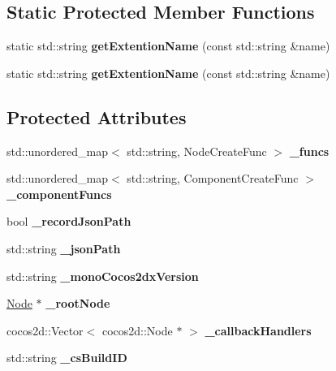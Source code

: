 \subsection*{Static Protected Member Functions}
\begin{DoxyCompactItemize}
\item 
\mbox{\label{classCSLoader_abdba36c81bb879eb45cc808b314517c8}} 
static std\+::string {\bfseries get\+Extention\+Name} (const std\+::string \&name)
\item 
\mbox{\label{classCSLoader_a33f15f08272184326b7688cccf3cff96}} 
static std\+::string {\bfseries get\+Extention\+Name} (const std\+::string \&name)
\end{DoxyCompactItemize}
\subsection*{Protected Attributes}
\begin{DoxyCompactItemize}
\item 
\mbox{\label{classCSLoader_a5fb5be0b4e61ef782782591312add253}} 
std\+::unordered\+\_\+map$<$ std\+::string, Node\+Create\+Func $>$ {\bfseries \+\_\+funcs}
\item 
\mbox{\label{classCSLoader_affe12650883d297eb683858bc7d8a9c4}} 
std\+::unordered\+\_\+map$<$ std\+::string, Component\+Create\+Func $>$ {\bfseries \+\_\+component\+Funcs}
\item 
\mbox{\label{classCSLoader_a3f25a907790895684604e8eb4cdf4e5c}} 
bool {\bfseries \+\_\+record\+Json\+Path}
\item 
\mbox{\label{classCSLoader_a885ef03388b3721ee777cbf57752061d}} 
std\+::string {\bfseries \+\_\+json\+Path}
\item 
\mbox{\label{classCSLoader_a05306794c9ebb0cc12f5e28ac3b40c1c}} 
std\+::string {\bfseries \+\_\+mono\+Cocos2dx\+Version}
\item 
\mbox{\label{classCSLoader_a250b8d0b7fbc84ceaa3f48c37a2c5597}} 
\hyperlink{classNode}{Node} $\ast$ {\bfseries \+\_\+root\+Node}
\item 
\mbox{\label{classCSLoader_a2fddb602da12212fd2a76aeb5a5a952e}} 
cocos2d\+::\+Vector$<$ cocos2d\+::\+Node $\ast$ $>$ {\bfseries \+\_\+callback\+Handlers}
\item 
\mbox{\label{classCSLoader_a423b3ad48d69ea672c848eadfea5e8b3}} 
std\+::string {\bfseries \+\_\+cs\+Build\+ID}
\end{DoxyCompactItemize}



